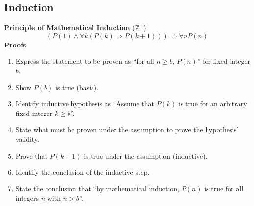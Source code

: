 \documentclass[12pt, A4, twocolumn]{article}
\newcommand{\Z}{\mathbb{Z}}
\begin{document}
		\subsection*{Induction}
			\textbf{Principle of Mathematical Induction} (\(\Z^+\))
				\[(P(1) \land \forall k(P(k) \Rightarrow P(k + 1))) \Rightarrow \forall n P(n)\]
			\textbf{Proofs}
				\begin{enumerate}
					\item
						Express the statement to be proven as \enquote{for all \(n \ge b\), \(P(n)\)} for fixed integer \(b\).
					\item
						Show \(P(b)\) is true (basis).
					\item
						Identify inductive hypothesis as \enquote{Assume that \(P(k)\) is true for an arbitrary fixed integer \(k \ge b\)}.
					\item
						State what must be proven under the assumption to prove the hypothesis' validity.
					\item
						Prove that \(P(k + 1)\) is true under the assumption (inductive).
					\item
						Identify the conclusion of the inductive step.
					\item
						State the conclusion that \enquote{by mathematical induction, \(P(n)\) is true for all integers \(n\) with \(n > b\)}.
				\end{enumerate}
\end{document}
